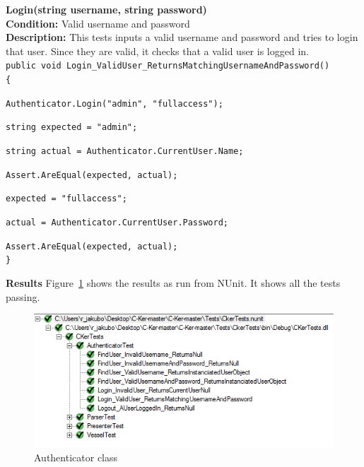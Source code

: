 \documentclass[12pt]{article}
\begin{document}
\clearpage

{\bfseries Login(string username, string password)}\\
{\bfseries Condition:} Valid username and password\\
{\bfseries Description:} This tests inputs a valid username and password and tries to login that user. Since they are valid, it checks that a valid user is logged in.\\

\texttt{public void Login\_ValidUser\_ReturnsMatchingUsernameAndPassword()}\\
\texttt{\{}\par       	 
\texttt{Authenticator.Login("admin", "fullaccess");}\par  	 
\texttt{string expected = "admin";}\par
\texttt{string actual = Authenticator.CurrentUser.Name;}\par
\texttt{Assert.AreEqual(expected, actual);}\par
\texttt{expected = "fullaccess";}\par
\texttt{actual = Authenticator.CurrentUser.Password;}\par
\texttt{Assert.AreEqual(expected, actual);}\\
\texttt{\}}\par

\clearpage

{\bfseries Results}\newline
Figure~\ref{fig:Authenticator class} shows the results as run from NUnit. It shows all the tests passing.

\begin{figure}[h!]
    \centering
    \includegraphics[scale=0.8]{Authenticator_class}
    \caption{Authenticator class}
    \label{fig:Authenticator class}
\end{figure}
\end{document}
